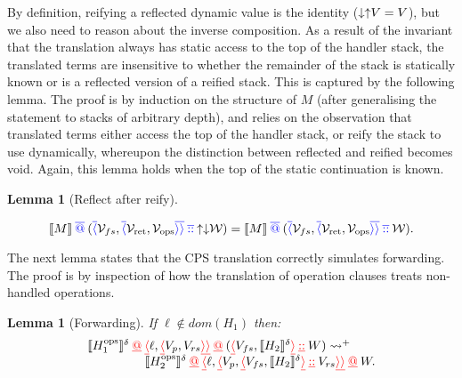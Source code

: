 \documentclass[12pt,phd,lfcs,twoside,openright,logo,leftchapter,normalheadings]{infthesis}
\theoremstyle{plain}
\newtheorem{lemma}[theorem]{Lemma}
\theoremstyle{definition}
\begin{document}
%
By definition, reifying a reflected dynamic value is the identity
($\mathord{\downarrow} \mathord{\uparrow} V = V$), but we also need to reason about the
inverse composition. As a result of the invariant that the translation
always has static access to the top of the handler stack, the
translated terms are insensitive to whether the remainder of the stack
is statically known or is a reflected version of a reified stack. This
is captured by the following lemma. The proof is by induction on the
structure of $M$ (after generalising the statement to stacks of
arbitrary depth), and relies on the observation that translated terms
either access the top of the handler stack, or reify the stack to use
dynamically, whereupon the distinction between reflected and reified
becomes void. Again, this lemma holds when the top of the static
continuation is known.
%
\begin{lemma}[Reflect after reify]
  \label{lem:reflect-after-reify-gen-cont}

  \[
    \llbracket M \rrbracket \mathbin{{\color{blue}\overline{@}}} ({\color{blue}\overline{\langle}}\mathcal{V}_{fs}, {\color{blue}\overline{\langle}}\mathcal{V}_{\mathrm{ret}},\mathcal{V}_{\mathrm{ops}}{\color{blue}\overline{\rangle}}{\color{blue}\overline{\rangle}} \mathbin{{\color{blue}\overline{::}}} \mathord{\uparrow} \mathord{\downarrow} \mathcal{W})
  =
  \llbracket M \rrbracket \mathbin{{\color{blue}\overline{@}}} ({\color{blue}\overline{\langle}}\mathcal{V}_{fs}, {\color{blue}\overline{\langle}}\mathcal{V}_{\mathrm{ret}},\mathcal{V}_{\mathrm{ops}}{\color{blue}\overline{\rangle}}{\color{blue}\overline{\rangle}} \mathbin{{\color{blue}\overline{::}}} \mathcal{W}).
  \]
\end{lemma}

The next lemma states that the CPS translation correctly simulates
forwarding. The proof is by inspection of how the translation of
operation clauses treats non-handled operations.
%
\begin{lemma}[Forwarding]\label{lem:forwarding-gen-cont}
  If $\ell \notin dom(H_1)$ then:
  \[
    \bl
    \cps{\hops_1}^\delta \dapp \dRecord{\ell, \dRecord{V_p, V_{\dhkr}}} \dapp (\dRecord{V_{fs}, \cps{H_2}^\delta} \dcons W)
    \reducesto^+ \qquad \\
    \hfill
       \cps{\hops_2}^\delta \dapp \dRecord{\ell, \dRecord{V_p, \dRecord{V_{fs}, \cps{H_2}^\delta} \dcons V_{\dhkr}}} \dapp W. \\
    \el
  \]
\end{lemma}
\end{document}
